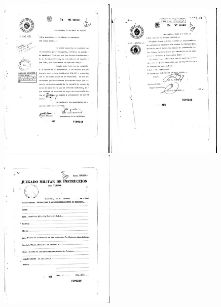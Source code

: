 \documentclass[11pt,a4paper]{article}
\begin{document}
\begin{figure}
\centering%
\includegraphics[width=0.49\textwidth]{r0566_0011.jpg}%
\includegraphics[width=0.49\textwidth]{r0566_0012.jpg}\\
\includegraphics[width=0.49\textwidth]{r0566_0013.jpg}%

\end{figure}
\end{document}
